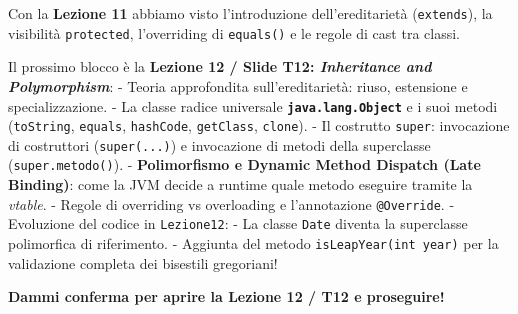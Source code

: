 \documentclass[11pt,a4paper]{article}
\newcommand{\passthrough}[1]{#1}
\begin{document}
\begin{studynote} Con la \textbf{Lezione 11} abbiamo visto l'introduzione
dell'ereditarietà (\passthrough{\lstinline!extends!}), la visibilità
\passthrough{\lstinline!protected!}, l'overriding di
\passthrough{\lstinline!equals()!} e le regole di cast tra classi.

Il prossimo blocco è la \textbf{Lezione 12 / Slide T12:
\emph{Inheritance and Polymorphism}}: - Teoria approfondita
sull'ereditarietà: riuso, estensione e specializzazione. - La classe
radice universale \textbf{\passthrough{\lstinline!java.lang.Object!}} e
i suoi metodi (\passthrough{\lstinline!toString!},
\passthrough{\lstinline!equals!}, \passthrough{\lstinline!hashCode!},
\passthrough{\lstinline!getClass!}, \passthrough{\lstinline!clone!}). -
Il costrutto \passthrough{\lstinline!super!}: invocazione di costruttori
(\passthrough{\lstinline!super(...)!}) e invocazione di metodi della
superclasse (\passthrough{\lstinline!super.metodo()!}). -
\textbf{Polimorfismo e Dynamic Method Dispatch (Late Binding)}: come la
JVM decide a runtime quale metodo eseguire tramite la \emph{vtable}. -
Regole di overriding vs overloading e l'annotazione
\passthrough{\lstinline!@Override!}. - Evoluzione del codice in
\passthrough{\lstinline!Lezione12!}: - La classe
\passthrough{\lstinline!Date!} diventa la superclasse polimorfica di
riferimento. - Aggiunta del metodo
\passthrough{\lstinline!isLeapYear(int year)!} per la validazione
completa dei bisestili gregoriani!
\end{studynote}

\textbf{Dammi conferma per aprire la Lezione 12 / T12 e proseguire!}
\end{document}
